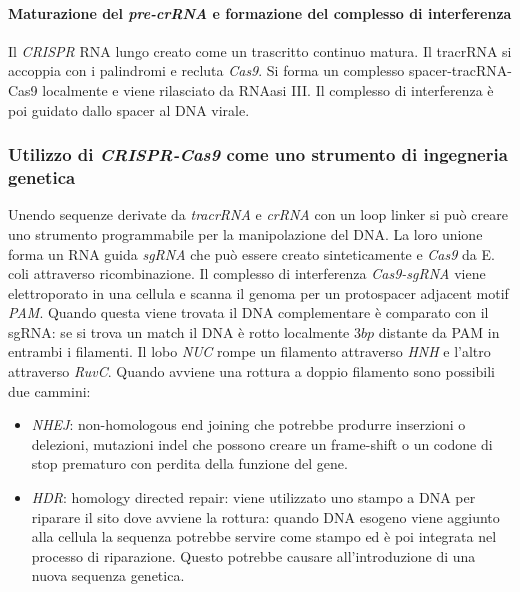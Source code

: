 \paragraph{Maturazione del \emph{pre-crRNA} e formazione del complesso di interferenza}
Il \emph{CRISPR} RNA lungo creato come un trascritto continuo matura. Il tracrRNA si accoppia con i palindromi e recluta \emph{Cas9}. Si forma un complesso spacer-tracRNA-Cas9 localmente
e viene rilasciato da RNAasi III. Il complesso di interferenza \`e poi guidato dallo spacer al DNA virale. 
\subsubsection{Utilizzo di \emph{CRISPR-Cas9} come uno strumento di ingegneria genetica}
Unendo sequenze derivate da \emph{tracrRNA} e \emph{crRNA} con un loop linker si pu\`o creare uno strumento programmabile per la manipolazione del DNA. La loro unione forma un 
RNA guida \emph{sgRNA} che pu\`o essere creato sinteticamente e \emph{Cas9} da E. coli attraverso ricombinazione. Il complesso di interferenza \emph{Cas9-sgRNA} viene elettroporato in
una cellula e scanna il genoma per un protospacer adjacent motif \emph{PAM}. Quando questa viene trovata il DNA complementare \`e comparato con il sgRNA: se si trova un match il 
DNA \`e rotto localmente $3bp$ distante da PAM in entrambi i filamenti. Il lobo \emph{NUC} rompe un filamento attraverso \emph{HNH} e l'altro attraverso \emph{RuvC}. Quando avviene
una rottura a doppio filamento sono possibili due cammini:
\begin{itemize}
	\item \emph{NHEJ}: non-homologous end joining che potrebbe produrre inserzioni o delezioni, mutazioni indel che possono creare un frame-shift o un codone di stop prematuro con
		perdita della funzione del gene.
	\item \emph{HDR}: homology directed repair: viene utilizzato uno stampo a DNA per riparare il sito dove avviene la rottura: quando DNA esogeno viene aggiunto alla cellula
		la sequenza potrebbe servire come stampo ed \`e poi integrata nel processo di riparazione. Questo potrebbe causare all'introduzione di una nuova sequenza genetica.
\end{itemize}
